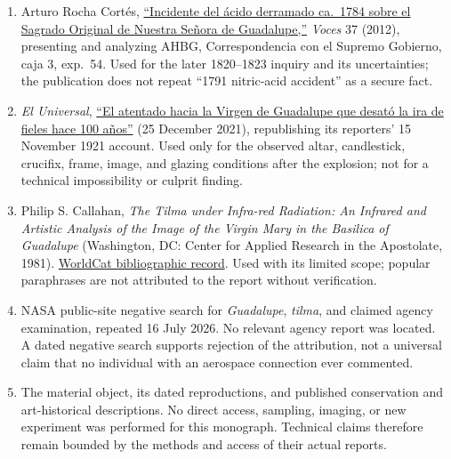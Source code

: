 \begin{enumerate}
  \item Arturo Rocha Cortés, \href{https://revistas.uic.mx/index.php/voces/es/issue/download/134/95}{“Incidente del ácido derramado ca.~1784 sobre el Sagrado Original de Nuestra Señora de Guadalupe,”} \emph{Voces} 37 (2012), presenting and analyzing AHBG, Correspondencia con el Supremo Gobierno, caja 3, exp.~54. Used for the later 1820--1823 inquiry and its uncertainties; the publication does not repeat “1791 nitric-acid accident” as a secure fact.

  \item \emph{El Universal}, \href{https://www.eluniversal.com.mx/cultura/el-atentado-hacia-la-virgen-de-guadalupe-de-hace-100-anos/}{“El atentado hacia la Virgen de Guadalupe que desató la ira de fieles hace 100 años”} (25 December 2021), republishing its reporters' 15 November 1921 account. Used only for the observed altar, candlestick, crucifix, frame, image, and glazing conditions after the explosion; not for a technical impossibility or culprit finding.

  \item Philip S. Callahan, \emph{The Tilma under Infra-red Radiation: An Infrared and Artistic Analysis of the Image of the Virgin Mary in the Basilica of Guadalupe} (Washington, DC: Center for Applied Research in the Apostolate, 1981). \href{https://search.worldcat.org/title/11200397}{WorldCat bibliographic record}. Used with its limited scope; popular paraphrases are not attributed to the report without verification.

  \item NASA public-site negative search for \emph{Guadalupe}, \emph{tilma}, and claimed agency examination, repeated 16 July 2026. No relevant agency report was located. A dated negative search supports rejection of the attribution, not a universal claim that no individual with an aerospace connection ever commented.

  \item The material object, its dated reproductions, and published conservation and art-historical descriptions. No direct access, sampling, imaging, or new experiment was performed for this monograph. Technical claims therefore remain bounded by the methods and access of their actual reports.
\end{enumerate}

\endgroup
